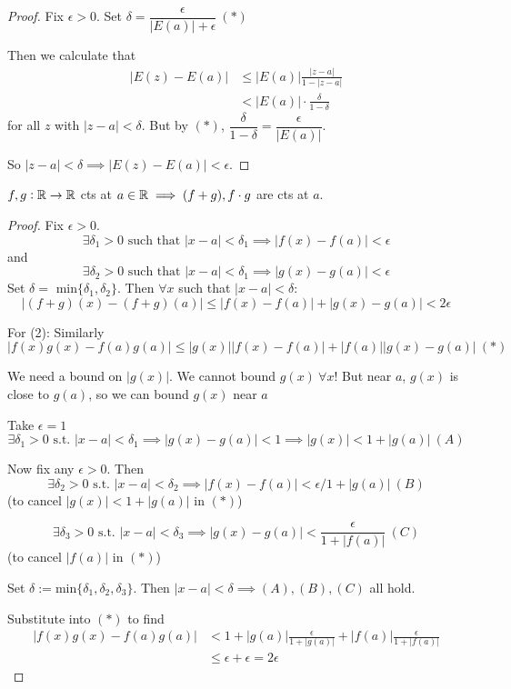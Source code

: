\documentclass[twoside]{scrartcl}
\begin{document}
\begin{proof}
Fix $\epsilon >0$. Set $\delta = \dfrac{\epsilon}{|E(a)| + \epsilon} ~(*)$

Then we calculate that 
\[\begin{aligned}
|E(z) - E(a)| &\leq |E(a)| \frac{|z-a|}{1-|z-a|} \\
&< |E(a)| \cdot \frac{\delta}{1-\delta}	
\end{aligned}
\]	
for all $z$ with $|z-a| < \delta$. But by $(*)$, $\dfrac{\delta}{1-\delta} = \dfrac{\epsilon}{|E(a)|}$. 

So $|z-a|< \delta \implies |E(z) - E(a)| < \epsilon$.
\end{proof}


\begin{theorem}
$f,g: \mathbb{R} \to \mathbb{R}$ cts at $a \in \mathbb{R} \implies (f + g), f\cdot g$ are cts at $a$.
\end{theorem}
\begin{proof}
	Fix $\epsilon >0.$ \[\exists \delta_1 >0 \text{ such that }|x-a| < \delta_1 \implies |f(x) - f(a)| < \epsilon\] and\[\exists \delta_2 >0 \text{ such that }|x-a| < \delta_1 \implies |g(x) - g(a)| < \epsilon\]
	 Set $\delta =$ min$\{\delta_1,\delta_2\}.$ Then $\forall x$ such that $|x-a| < \delta:$
	\[|(f+g)(x) - (f+g)(a)| \leq |f(x) - f(a)| + |g(x) - g(a)| < 2\epsilon\]
	
	For (2): Similarly
	\[|f(x)g(x) - f(a)g(a)| \leq |g(x)||f(x) - f(a)| + |f(a)||g(x) - g(a)| ~(*)\]
	
	We need a bound on $|g(x)|$. We cannot bound $g(x)~ \forall x$!  But near $a$, $g(x)$ is close to $g(a)$, so we can bound $g(x)$ near $a$
	
	Take $\epsilon =1$ 
	\[\exists \delta_1 > 0\text{ s.t. }|x-a| < \delta_1 \implies |g(x) - g(a)| < 1 \implies |g(x)| < 1 + |g(a)| ~(A)\]
	
	Now fix any $\epsilon >0$. Then 
	\[\exists \delta_2 > 0\text{ s.t. }|x-a| < \delta_2 \implies |f(x) - f(a)| < \epsilon/1+|g(a)| ~ (B)\] (to cancel $|g(x)| < 1+|g(a)|$ in $(*)$)
	
	\[\exists \delta_3 > 0 \text{ s.t. } |x-a| < \delta_3 \implies |g(x) - g(a)| < \frac{\epsilon}{1 + |f(a)|}~ (C)\]
	(to cancel $|f(a)|$ in $(*)$)
	
	Set $\delta := \mathrm{min}\{\delta_1,\delta_2,\delta_3\}$. Then $|x-a| < \delta \implies (A), (B), (C)$ all hold. 
	
	Substitute into $(*)$ to find 
	\[\begin{aligned}|f(x)g(x) - f(a)g(a)| &< 1+|g(a)|\frac{\epsilon}{1+|g(a)|} + |f(a)|\frac{\epsilon}{1 + |f(a)|}\\
	&\leq \epsilon + \epsilon = 2\epsilon
\end{aligned}\]
\end{proof}
\end{document}
